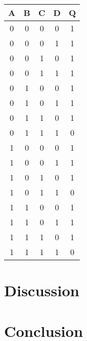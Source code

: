 \documentclass[12pt]{article}
\begin{document}
\begin{table}
	\centering
	\begin{tabular}{|c|c|c|c|c|}
		\hline
		\textbf{A} & \textbf{B} & \textbf{C} & \textbf{D} & \textbf{Q} \\
		\hline
		0 & 0 & 0 & 0 & 1 \\
		\hline
		0 & 0 & 0 & 1 & 1 \\
		\hline
		0 & 0 & 1 & 0 & 1 \\
		\hline
		0 & 0 & 1 & 1 & 1 \\
		\hline
		0 & 1 & 0 & 0 & 1 \\
		\hline
		0 & 1 & 0 & 1 & 1 \\
		\hline
		0 & 1 & 1 & 0 & 1 \\
		\hline
		0 & 1 & 1 & 1 & 0 \\
		\hline
		1 & 0 & 0 & 0 & 1 \\
		\hline
		1 & 0 & 0 & 1 & 1 \\
		\hline
		1 & 0 & 1 & 0 & 1 \\
		\hline
		1 & 0 & 1 & 1 & 0 \\
		\hline
		1 & 1 & 0 & 0 & 1 \\
		\hline
		1 & 1 & 0 & 1 & 1 \\
		\hline
		1 & 1 & 1 & 0 & 1 \\
		\hline
		1 & 1 & 1 & 1 & 0 \\
		\hline
	\end{tabular}
\end{table}
\section{Discussion}
\section{Conclusion}
\end{document}
